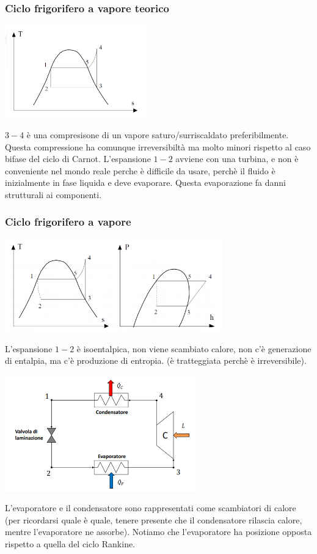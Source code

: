 \subsubsection{Ciclo frigorifero a vapore teorico}
\begin{center}
    \includegraphics[height=4cm]{../L08/img15.PNG}
\end{center}
$3-4$ è una compresisone di un vapore saturo/surriscaldato preferibilmente. Questa compressione ha comunque irreversibiltà ma molto minori rispetto al caso bifase del ciclo di Carnot.\newline
\newline
L'espansione $1-2$ avviene con una turbina, e non è conveniente nel mondo reale perche è difficile da usare, perchè il fluido è inizialmente in fase liquida e deve evaporare. Questa evaporazione fa danni strutturali ai componenti.
\subsubsection{Ciclo frigorifero a vapore} 
\begin{center}
    \includegraphics[height=4cm]{../L08/img16.PNG}
\end{center}
L'espansione $1-2$ è isoentalpica, non viene scambiato calore, non c'è generazione di entalpia, ma c'è produzione di entropia. (è tratteggiata perchè è irreversibile).
\begin{center}
    \includegraphics[height=5cm]{../L08/img17.PNG}
\end{center}
L'evaporatore e il condensatore sono rappresentati come scambiatori di calore (per ricordarsi quale è quale, tenere presente che il condensatore rilascia calore, mentre l'evaporatore ne assorbe).\newline
Notiamo che l'evaporatore ha posizione opposta rispetto a quella del ciclo Rankine.\newline